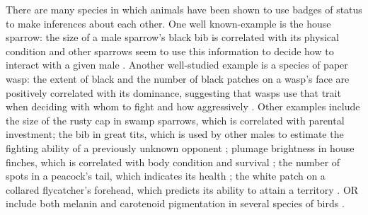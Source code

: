 There are many species in which animals have been shown to use badges of status to make inferences about each other. One well known-example is the house sparrow: the size of a male sparrow's black bib is correlated with its physical condition and other sparrows seem to use this information to decide how to interact with a given male \cite{Moller:1987vn}. Another well-studied example is a species of paper wasp: the extent of black and the number of black patches on a wasp's face are positively correlated with its dominance, suggesting that wasps use that trait when deciding with whom to fight and how aggressively \cite{Tibbetts:2004kx,Tibbetts:2007zr}. Other examples include the size of the rusty cap in swamp sparrows, which is correlated with parental investment\cite{Olsen:2010uq}; the bib in great tits, which is used by other males to estimate the fighting ability of a previously unknown opponent \cite{Lemel:1993ve}; plumage brightness in house finches, which is correlated with body condition and survival \cite{McGraw:2000qf}; the number of spots in a peacock's tail, which indicates its health \cite{Loyau:2005nx}; the white patch on a collared flycatcher's forehead, which predicts its ability to attain a territory \cite{Part:1997ys}. OR include both melanin and carotenoid pigmentation in several species of birds \cite{Olsen:2010uq,Lemel:1993ve,McGraw:2000qf,Young:2015dq,Jawor:2003bh}. 



